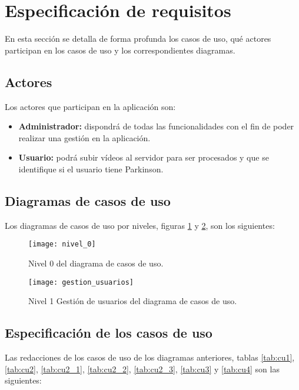 \section{Especificación de requisitos}
En esta sección se detalla de forma profunda los casos de uso, qué actores participan en los casos de uso y los correspondientes diagramas.

\subsection{Actores}
Los actores que participan en la aplicación son:

\begin{itemize}
	\item \textbf{Administrador:} dispondrá de todas las funcionalidades con el fin de poder realizar una gestión en la aplicación.
	\item \textbf{Usuario:} podrá subir vídeos al servidor para ser procesados y que se identifique si el usuario tiene Parkinson.
\end{itemize}

\subsection{Diagramas de casos de uso}
Los diagramas de casos de uso por niveles, figuras \ref{fig:nivel_0} y \ref{fig:gestion_usuarios}, son los siguientes:

\begin{figure}[h]
	\texttt{[image: nivel\_0]}
	\caption{Nivel 0 del diagrama de casos de uso.}
	\label{fig:nivel_0}
\end{figure}

\begin{figure}[h]
	\texttt{[image: gestion\_usuarios]}
	\caption{Nivel 1 Gestión de usuarios del diagrama de casos de uso.}
	\label{fig:gestion_usuarios}
\end{figure}

\subsection{Especificación de los casos de uso}
Las redacciones de los casos de uso de los diagramas anteriores, tablas \ref{tab:cu1}, \ref{tab:cu2}, \ref{tab:cu2_1}, \ref{tab:cu2_2}, \ref{tab:cu2_3}, \ref{tab:cu3} y \ref{tab:cu4} son las siguientes:

